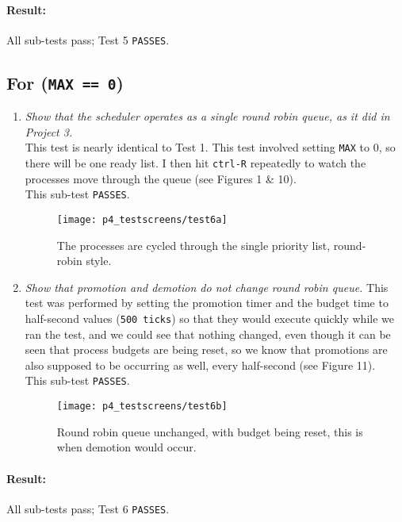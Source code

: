 \documentclass[11pt,letterpaper]{report}
\begin{document}
	\paragraph{Result:}All sub-tests pass; Test 5 {\tt PASSES}.

	\subsection{For ({\tt MAX == 0})}

	\begin{enumerate}
		\item \emph{Show that the scheduler operates as a single round robin queue, as it did in Project 3.}\\
		This test is nearly identical to Test 1. This test involved setting {\tt MAX} to 0, so there will be one ready list. I then hit {\tt ctrl-R} repeatedly to watch the processes move through the queue (see {\color{red} Figures 1 \& 10}).\\
		This sub-test {\tt PASSES}.
		\begin{figure}
			\centering
			\texttt{[image: p4\_testscreens/test6a]}
			\caption{The processes are cycled through the single priority list, round-robin style.}
			\label{fig:test6a}
		\end{figure}
		
		\item \emph{Show that promotion and demotion do not change round robin queue.}
		This test was performed by setting the promotion timer and the budget time to half-second values ({\tt 500 ticks}) so that they would execute quickly while we ran the test, and we could see that nothing changed, even though it can be seen that process budgets are being reset, so we know that promotions are also supposed to be occurring as well, every half-second (see {\color{red} Figure 11}).\\
		This sub-test {\tt PASSES}.
		\begin{figure}
			\centering
			\texttt{[image: p4\_testscreens/test6b]}
			\caption{Round robin queue unchanged, with budget being reset, this is when demotion would occur.}
			\label{fig:test6b}
		\end{figure}
	\end{enumerate}
	\paragraph{Result:}All sub-tests pass; Test 6 {\tt PASSES}.
\end{document}
